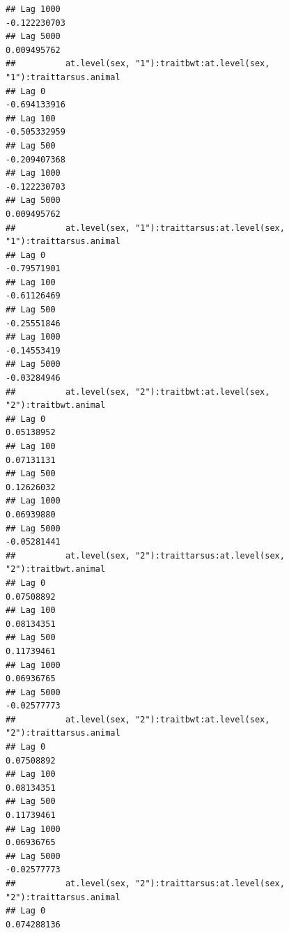 \documentclass[
  12pt,
]{book}
\begin{document}
\begin{verbatim}
## Lag 1000                                                      -0.122230703
## Lag 5000                                                       0.009495762
##          at.level(sex, "1"):traitbwt:at.level(sex, "1"):traittarsus.animal
## Lag 0                                                         -0.694133916
## Lag 100                                                       -0.505332959
## Lag 500                                                       -0.209407368
## Lag 1000                                                      -0.122230703
## Lag 5000                                                       0.009495762
##          at.level(sex, "1"):traittarsus:at.level(sex, "1"):traittarsus.animal
## Lag 0                                                             -0.79571901
## Lag 100                                                           -0.61126469
## Lag 500                                                           -0.25551846
## Lag 1000                                                          -0.14553419
## Lag 5000                                                          -0.03284946
##          at.level(sex, "2"):traitbwt:at.level(sex, "2"):traitbwt.animal
## Lag 0                                                        0.05138952
## Lag 100                                                      0.07131131
## Lag 500                                                      0.12626032
## Lag 1000                                                     0.06939880
## Lag 5000                                                    -0.05281441
##          at.level(sex, "2"):traittarsus:at.level(sex, "2"):traitbwt.animal
## Lag 0                                                           0.07508892
## Lag 100                                                         0.08134351
## Lag 500                                                         0.11739461
## Lag 1000                                                        0.06936765
## Lag 5000                                                       -0.02577773
##          at.level(sex, "2"):traitbwt:at.level(sex, "2"):traittarsus.animal
## Lag 0                                                           0.07508892
## Lag 100                                                         0.08134351
## Lag 500                                                         0.11739461
## Lag 1000                                                        0.06936765
## Lag 5000                                                       -0.02577773
##          at.level(sex, "2"):traittarsus:at.level(sex, "2"):traittarsus.animal
## Lag 0                                                             0.074288136

\end{verbatim}
\end{document}
